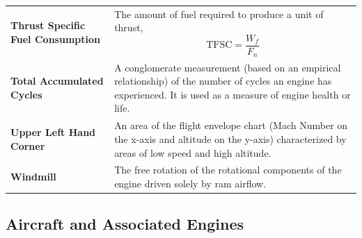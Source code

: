 \documentclass[
]{book}
\begin{document}
\begin{longtable}[]{@{}ll@{}}
\begin{minipage}[t]{0.24\columnwidth}
\textbf{Thrust Specific Fuel Consumption}\strut
\end{minipage} & \begin{minipage}[t]{0.71\columnwidth}\raggedright
The amount of fuel required to produce a unit of thrust, \[\mathrm{TFSC} = \frac{W_f}{F_n}\]\strut
\end{minipage}\tabularnewline
\begin{minipage}[t]{0.24\columnwidth}\raggedright
\textbf{Total Accumulated Cycles}\strut
\end{minipage} & \begin{minipage}[t]{0.71\columnwidth}\raggedright
A conglomerate measurement (based on an empirical relationship) of the number of cycles an engine has experienced. It is used as a measure of engine health or life.\strut
\end{minipage}\tabularnewline
\begin{minipage}[t]{0.24\columnwidth}\raggedright
\textbf{Upper Left Hand Corner}\strut
\end{minipage} & \begin{minipage}[t]{0.71\columnwidth}\raggedright
An area of the flight envelope chart (Mach Number on the x-axis and altitude on the y-axis) characterized by areas of low speed and high altitude.\strut
\end{minipage}\tabularnewline
\begin{minipage}[t]{0.24\columnwidth}\raggedright
\textbf{Windmill}\strut
\end{minipage} & \begin{minipage}[t]{0.71\columnwidth}\raggedright
The free rotation of the rotational components of the engine driven solely by ram airflow.\strut
\end{minipage}\tabularnewline
\bottomrule
\end{longtable}

\hypertarget{aircraft-and-associated-engines}{%
\subsection{Aircraft and Associated Engines}\label{aircraft-and-associated-engines}}
\end{document}
